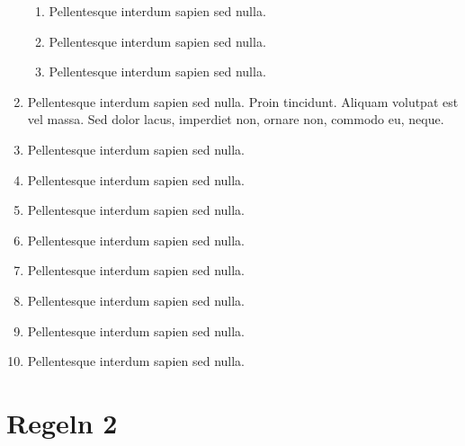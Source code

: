 \documentclass[ngerman]{scrartcl}
\begin{document}
\begin{enumerate}
\begin{enumerate}
				\item Pellentesque interdum sapien sed nulla.
				\item Pellentesque interdum sapien sed nulla.
				\item Pellentesque interdum sapien sed nulla.
			\end{enumerate}
		\item Pellentesque interdum sapien sed nulla. Proin tincidunt. Aliquam volutpat est vel massa. Sed
dolor lacus, imperdiet non, ornare non, commodo eu, neque.
		\item Pellentesque interdum sapien sed nulla.
		\item Pellentesque interdum sapien sed nulla.
		\item Pellentesque interdum sapien sed nulla.
		\item Pellentesque interdum sapien sed nulla.
		\item Pellentesque interdum sapien sed nulla.
		\item Pellentesque interdum sapien sed nulla.
		\item Pellentesque interdum sapien sed nulla.
		\item Pellentesque interdum sapien sed nulla.
	\end{enumerate}

	\section{Regeln 2}
\end{document}
